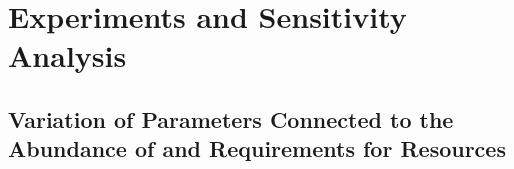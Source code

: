 \FloatBarrier
\section{Experiments and Sensitivity Analysis}

\subsection{Variation of Parameters Connected to the Abundance of and Requirements for Resources}


